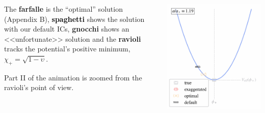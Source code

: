 \begin{frame}[plain]%
    \begin{columns}   
    \begin{column}{0.5\textwidth}\small
        The \textcolor{O2}{\textbf{farfalle}} is the ``optimal'' solution (Appendix B), \textcolor{black}{\textbf{spaghetti}} shows the solution with our default ICs, \textcolor{uiopink2}{\textbf{gnocchi}} shows an <<unfortunate>> solution and the \textcolor{uiogrey}{\textbf{ravioli}} tracks the potential's positive minimum, $\chi_+=\sqrt{1-\upsilon}$. 
        \smallskip

        {Part II of the animation is zoomed from the \textcolor{uiogrey}{ravioli}'s point of view.}

    \end{column}
    \begin{column}{0.5\textwidth}\small
        \centering
        \vspace*{-3mm}
        \ifCompAnims 
        \else 
        \includegraphics[keepaspectratio,width=\columnwidth,height=0.98\textheight]{gifs/asym_ball/asym_ball-199}
        \fi
    \end{column}
    \end{columns}
    
\begin{notes}[1][animation]
\end{notes}
\end{frame}


